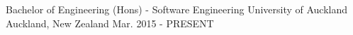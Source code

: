 
\begin{cventries}
  \cventry
    {Bachelor of Engineering (Hons) - Software Engineering}
    {University of Auckland}
    {Auckland, New Zealand}
    {Mar. 2015 - PRESENT}
    {}
\end{cventries}
\vspace{-5pt}